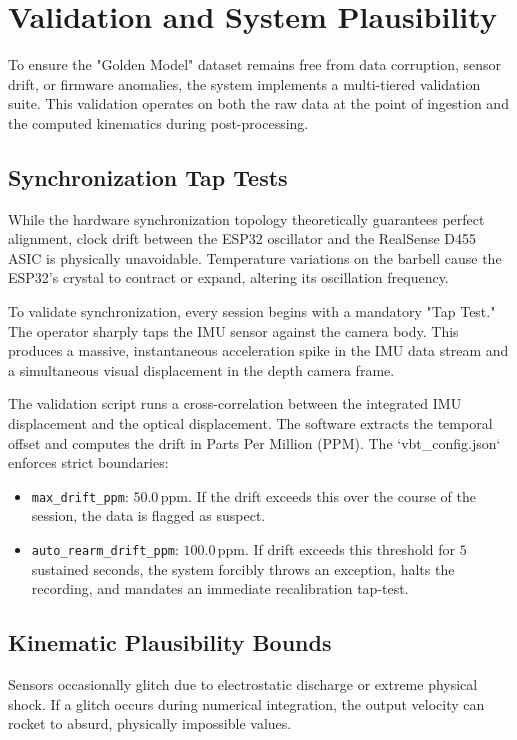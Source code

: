 \section{Validation and System Plausibility}

To ensure the "Golden Model" dataset remains free from data corruption, sensor drift, or firmware anomalies, the system implements a multi-tiered validation suite. This validation operates on both the raw data at the point of ingestion and the computed kinematics during post-processing.

\subsection{Synchronization Tap Tests}
While the hardware synchronization topology theoretically guarantees perfect alignment, clock drift between the ESP32 oscillator and the RealSense D455 ASIC is physically unavoidable. Temperature variations on the barbell cause the ESP32's crystal to contract or expand, altering its oscillation frequency. 

To validate synchronization, every session begins with a mandatory "Tap Test." The operator sharply taps the IMU sensor against the camera body. This produces a massive, instantaneous acceleration spike in the IMU data stream and a simultaneous visual displacement in the depth camera frame. 

The validation script runs a cross-correlation between the integrated IMU displacement and the optical displacement. The software extracts the temporal offset and computes the drift in Parts Per Million (PPM). 
The `vbt_config.json` enforces strict boundaries:
\begin{itemize}
    \item \texttt{max\_drift\_ppm}: $50.0\,\text{ppm}$. If the drift exceeds this over the course of the session, the data is flagged as suspect.
    \item \texttt{auto\_rearm\_drift\_ppm}: $100.0\,\text{ppm}$. If drift exceeds this threshold for $5$ sustained seconds, the system forcibly throws an exception, halts the recording, and mandates an immediate recalibration tap-test.
\end{itemize}

\subsection{Kinematic Plausibility Bounds}
Sensors occasionally glitch due to electrostatic discharge or extreme physical shock. If a glitch occurs during numerical integration, the output velocity can rocket to absurd, physically impossible values.

